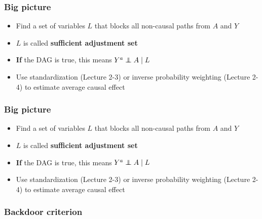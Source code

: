 \documentclass{beamer}
\def\independenT#1#2{\mathrel{\rlap{$#1#2$}\mkern2mu{#1#2}}}
\newcommand\indep{\protect\mathpalette{\protect\independenT}{\perp}}
\begin{document}
\begin{frame}
\frametitle{Big picture}

\begin{itemize}
     \item Find a set of variables $L$ that blocks all non-causal paths from $A$ and $Y$
     \item $L$ is called \textbf{sufficient adjustment set} \pause 
     \item \textbf{If} the DAG is true, this means $Y^{a} \indep A \mid L$ \pause
    \item Use standardization (Lecture 2-3) or inverse probability weighting (Lecture 2-4) to estimate average causal effect
\end{itemize}

\end{frame}



\begin{frame}
\frametitle{Big picture}

\begin{itemize}
     \item Find a set of variables $L$ that blocks all non-causal paths from $A$ and $Y$
     \item $L$ is called \textbf{sufficient adjustment set} \pause 
     \item \textbf{If} the DAG is true, this means $Y^{a} \indep A \mid L$ \pause
    \item Use standardization (Lecture 2-3) or inverse probability weighting (Lecture 2-4) to estimate average causal effect
\end{itemize}

\end{frame}


\begin{frame}
\frametitle{Backdoor criterion}

\begin{figure}
\end{figure}

\vspace{1em}

\vspace{1em}
\end{frame}
\end{document}
